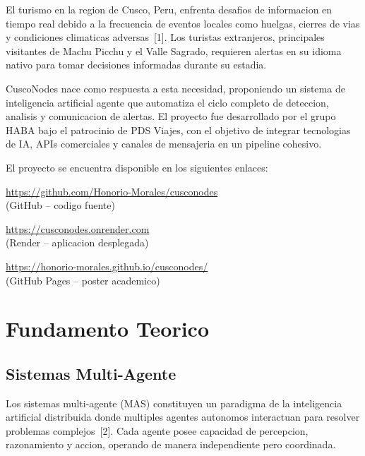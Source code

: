 \documentclass[10pt,twocolumn,a4paper]{article}
\begin{document}
\lettrine[lines=2]{E}{}l turismo en la region de Cusco, Peru,
enfrenta desafios de informacion en tiempo real debido a la
frecuencia de eventos locales como huelgas, cierres de vias y
condiciones climaticas adversas~[1]. Los turistas extranjeros,
principales visitantes de Machu Picchu y el Valle Sagrado,
requieren alertas en su idioma nativo para tomar decisiones
informadas durante su estadia.

CuscoNodes nace como respuesta a esta necesidad, proponiendo un
sistema de inteligencia artificial agente que automatiza el ciclo
completo de deteccion, analisis y comunicacion de alertas. El
proyecto fue desarrollado por el grupo HABA bajo el patrocinio de
PDS Viajes, con el objetivo de integrar tecnologias de IA, APIs
comerciales y canales de mensajeria en un pipeline cohesivo.

El proyecto se encuentra disponible en los siguientes enlaces:
\begin{center}
\small
\url{https://github.com/Honorio-Morales/cusconodes} \\
(GitHub -- codigo fuente)
\end{center}
\begin{center}
\small
\url{https://cusconodes.onrender.com} \\
(Render -- aplicacion desplegada)
\end{center}
\begin{center}
\small
\url{https://honorio-morales.github.io/cusconodes/} \\
(GitHub Pages -- poster academico)
\end{center}

\section{Fundamento Teorico}

\subsection{Sistemas Multi-Agente}

Los sistemas multi-agente (MAS) constituyen un paradigma de la
inteligencia artificial distribuida donde multiples agentes
autonomos interactuan para resolver problemas complejos~[2]. Cada
agente posee capacidad de percepcion, razonamiento y accion,
operando de manera independiente pero coordinada.
\end{document}
